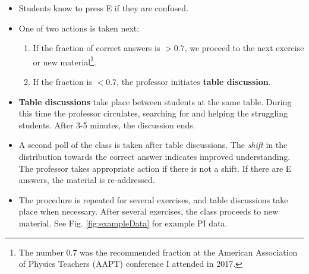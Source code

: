 \documentclass[../../../main.tex]{subfiles}
\begin{document}
\begin{itemize}
\begin{figure}
\end{figure}
\item Students know to press E if they are confused.
\item One of two actions is taken next:
\begin{enumerate}
\item If the fraction of correct answers is $>0.7$, we proceed to the next exercise or new material\footnote{The number 0.7 was the recommended fraction at the American Association of Physics Teachers (AAPT) conference I attended in 2017.}.
\item If the fraction is $<0.7$, the professor initiates \textbf{table discussion}.
\end{enumerate}
\item \textbf{Table discussions} take place between students at the same table.  During this time the professor circulates, searching for and helping the struggling students.  After 3-5 minutes, the discussion ends.
\item A second poll of the class is taken after table discussions.  The \textit{shift} in the distribution towards the correct answer indicates improved understanding.  The professor takes appropriate action if there is not a shift.  If there are E answers, the material is re-addressed.
\item The procedure is repeated for several exercises, and table discussions take place when necessary.  After several exercises, the class proceeds to new material. See Fig. \ref{fig:exampleData} for example PI data.
\end{itemize}
\end{document}
